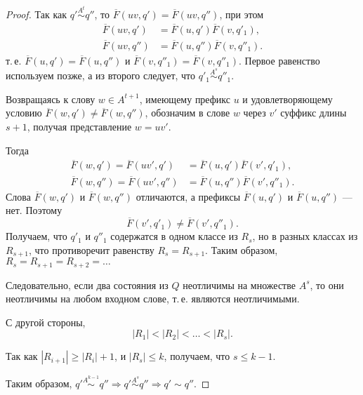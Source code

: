 \begin{proof}
    Так как $q'\stackrel{A^t}{\sim} q''$, то $\overline{F}(uv, q') = \overline{F}(uv, q'')$, при этом 
    \begin{align*}
        \overline{F}(uv, q') &= \overline{F}(u, q')\overline{F}(v, q'_1),\\
        \overline{F}(uv, q'') &= \overline{F}(u, q'')\overline{F}(v, q''_1).
    \end{align*}
    т.\,е. $\overline{F}(u, q') = \overline{F}(u, q'')$ и $\overline{F}(v, q''_1) = \overline{F}(v, q''_1)$. Первое равенство используем позже, а из второго следует, что $q'_1\stackrel{A^s}{\sim} q''_1$.

    Возвращаясь к слову $w \in A^{t+1}$, имеющему префикс $u$ и удовлетворяющему условию $\overline{F}(w, q') \neq \overline{F}(w, q'')$, обозначим в слове $w$ через $v'$ суффикс длины $s+1$, получая представление $w=uv'$.

    Тогда
    \begin{align*}
        \overline{F}(w, q') = \overline{F}(uv', q') &= \overline{F}(u, q') \overline{F}(v', q'_1),\\
        \overline{F}(w, q'') = \overline{F}(uv', q'') &= \overline{F}(u, q'') \overline{F}(v', q''_1).
    \end{align*}
    Слова $\overline{F}(w, q')$ и $\overline{F}(w, q'')$ отличаются, а префиксы $\overline{F}(u, q')$ и $\overline{F}(u, q'')$ --- нет. Поэтому 
    \[
        \overline{F}(v', q'_1) \neq \overline{F}(v', q''_1).
    \]
    Получаем, что $q'_1$ и $q''_1$ содержатся в одном классе из $R_s$, но в разных классах из $R_{s+1}$, что противоречит равенству $R_s = R_{s+1}$. Таким образом, $R_s = R_{s+1} = R_{s+2} = \ldots$

    Следовательно, если два состояния из $Q$ неотличимы на множестве $A^s$, то они неотличимы на любом входном слове, т.\,е. являются неотличимыми.

    С другой стороны, 
    \[
        |R_1| < |R_2| < \ldots < |R_s|.
    \]

    Так как $|R_{i+1}| \geqslant |R_{i}| + 1$, и $|R_s| \leqslant k$, получаем, что $s\leqslant k-1$.

    Таким образом, $q' \stackrel{A^{k-1}}{\sim} q'' \Rightarrow q' \stackrel{A^{s}}{\sim} q''\Rightarrow q' \sim q''$. 
\end{proof}

